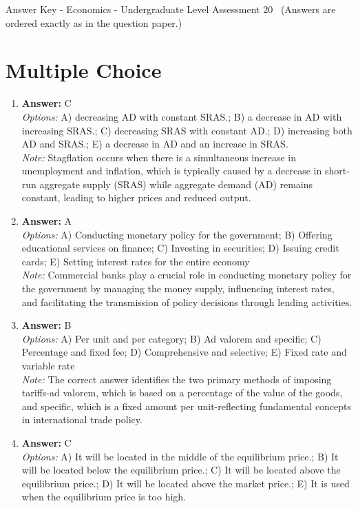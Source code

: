 \documentclass[12pt]{article}
\begin{document}
\begin{center}
Answer Key - Economics - Undergraduate Level Assessment 20 \
\small (Answers are ordered exactly as in the question paper.)
\end{center}

\section*{Multiple Choice}
\begin{enumerate}[label=\arabic*.]
\item \textbf{Answer:} C
\\ \textit{Options:} A) decreasing AD with constant SRAS.; B) a decrease in AD with increasing SRAS.; C) decreasing SRAS with constant AD.; D) increasing both AD and SRAS.; E) a decrease in AD and an increase in SRAS.
\\ \textit{Note:} Stagflation occurs when there is a simultaneous increase in unemployment and inflation, which is typically caused by a decrease in short-run aggregate supply (SRAS) while aggregate demand (AD) remains constant, leading to higher prices and reduced output.
\item \textbf{Answer:} A
\\ \textit{Options:} A) Conducting monetary policy for the government; B) Offering educational services on finance; C) Investing in securities; D) Issuing credit cards; E) Setting interest rates for the entire economy
\\ \textit{Note:} Commercial banks play a crucial role in conducting monetary policy for the government by managing the money supply, influencing interest rates, and facilitating the transmission of policy decisions through lending activities.
\item \textbf{Answer:} B
\\ \textit{Options:} A) Per unit and per category; B) Ad valorem and specific; C) Percentage and fixed fee; D) Comprehensive and selective; E) Fixed rate and variable rate
\\ \textit{Note:} The correct answer identifies the two primary methods of imposing tariffs-ad valorem, which is based on a percentage of the value of the goods, and specific, which is a fixed amount per unit-reflecting fundamental concepts in international trade policy.
\item \textbf{Answer:} C
\\ \textit{Options:} A) It will be located in the middle of the equilibrium price.; B) It will be located below the equilibrium price.; C) It will be located above the equilibrium price.; D) It will be located above the market price.; E) It is used when the equilibrium price is too high.

\end{enumerate}
\end{document}

